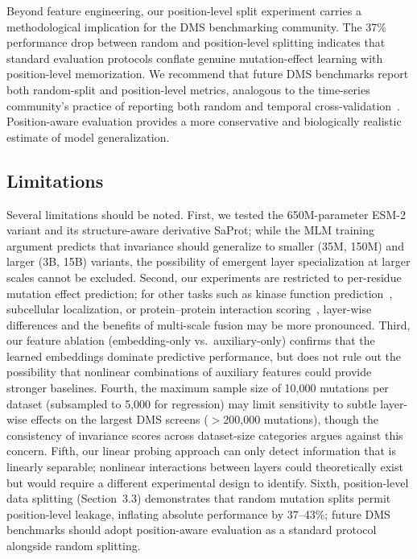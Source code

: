 \documentclass[11pt,a4paper]{article}
\begin{document}
Beyond feature engineering, our position-level split experiment carries a
methodological implication for the DMS benchmarking community. The 37\% performance
drop between random and position-level splitting indicates that standard evaluation
protocols conflate genuine mutation-effect learning with position-level memorization.
We recommend that future DMS benchmarks report both random-split and position-level
metrics, analogous to the time-series community's practice of reporting both random
and temporal cross-validation~\cite{roberts2017crossvalidation}. Position-aware
evaluation provides a more conservative and biologically realistic estimate of
model generalization.

\subsection{Limitations}

Several limitations should be noted. First, we tested the 650M-parameter
ESM-2 variant and its structure-aware derivative SaProt; while the MLM training
argument predicts that invariance should
generalize to smaller (35M, 150M) and larger (3B, 15B) variants, the possibility
of emergent layer specialization at larger scales cannot be excluded. Second, our
experiments are restricted to per-residue mutation effect prediction; for other
tasks such as kinase function prediction~\cite{kumar2025}, subcellular
localization, or protein--protein interaction scoring~\cite{elshaffei2025},
layer-wise differences and the benefits of multi-scale fusion may be more
pronounced. Third, our feature ablation (embedding-only vs.\ auxiliary-only)
confirms that the learned embeddings dominate predictive performance, but does
not rule out the possibility that nonlinear combinations of auxiliary features
could provide stronger baselines.
Fourth, the
maximum sample size of 10,000 mutations per dataset (subsampled to 5,000 for
regression) may limit sensitivity to
subtle layer-wise effects on the largest DMS screens ($>$200,000 mutations),
though the consistency of invariance scores across dataset-size categories argues
against this concern. Fifth, our linear probing approach can only detect
information that is linearly separable; nonlinear interactions between layers
could theoretically exist but would require a different experimental design to
identify. Sixth, position-level data splitting (Section~3.3) demonstrates that
random mutation splits permit position-level leakage, inflating absolute
performance by 37--43\%; future DMS benchmarks should adopt position-aware
evaluation as a standard protocol alongside random splitting.
\end{document}
